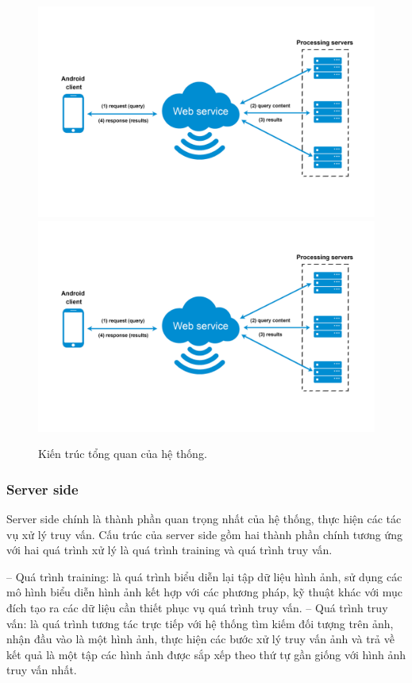 \begin{figure}[!htbp]
  \begin{center}
    \leavevmode
    \ifpdf
      \includegraphics[scale=0.14]{architecture}
    \else
      \includegraphics[scale=0.14]{architecture}
    \fi
    \caption[Kiến trúc tổng quan của hệ thống]{Kiến trúc tổng quan của hệ thống.}
    \label{FigArchitecture}
  \end{center}
\end{figure}

\subsubsection{Server side}
Server side chính là thành phần quan trọng nhất của hệ thống, thực hiện các tác vụ xử lý truy vấn. Cấu trúc của server side gồm hai thành phần chính tương ứng với hai quá trình xử lý là quá trình training và quá trình truy vấn.

-- Quá trình training: là quá trình biểu diễn lại tập dữ liệu hình ảnh, sử dụng các mô hình biểu diễn hình ảnh kết hợp với các phương pháp, kỹ thuật khác với mục đích tạo ra các dữ liệu cần thiết phục vụ quá trình truy vấn.
-- Quá trình truy vấn: là quá trình tương tác trực tiếp với hệ thống tìm kiếm đối tượng trên ảnh, nhận đầu vào là một hình ảnh, thực hiện các bước xử lý truy vấn ảnh và trả về kết quả là một tập các hình ảnh được sắp xếp theo thứ tự gần giống với hình ảnh truy vấn nhất.

